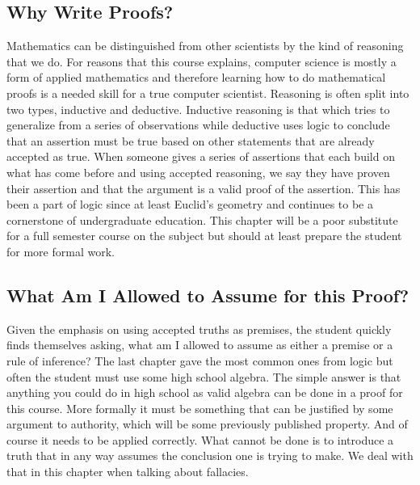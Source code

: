   \subsection {Why Write Proofs?}
Mathematics can be distinguished from other scientists by the kind of reasoning that we do. For reasons that this course explains, computer science is mostly a form of applied mathematics and therefore learning how to do mathematical proofs is a needed skill for a true computer scientist. Reasoning is often split into two types, inductive and deductive. Inductive reasoning is that which tries to generalize from a series of observations while deductive uses logic to conclude that an assertion must be true based on other statements that are already accepted as true. When someone gives a series of assertions that each build on what has come before and using accepted reasoning, we say they have proven their assertion and that the argument is a valid proof of the assertion. This has been a part of logic since at least Euclid's geometry and continues to be a cornerstone of undergraduate education. This chapter will be a poor substitute for a full semester course on the subject but should at least prepare the student for more formal work.

  \subsection{What Am I Allowed to Assume for this Proof?}
Given the emphasis on using accepted truths as premises, the student quickly finds themselves asking, what am I allowed to assume as either a premise or a rule of inference? The last chapter gave the most common ones from logic but often the student must use some high school algebra. The simple answer is that anything you could do in high school as valid algebra can be done in a proof for this course. More formally it must be something that can be justified by some argument to authority, which will be some previously published property. And of course it needs to be applied correctly. What cannot be done is to introduce a truth that in any way assumes the conclusion one is trying to make. We deal with that in this chapter when talking about fallacies.

